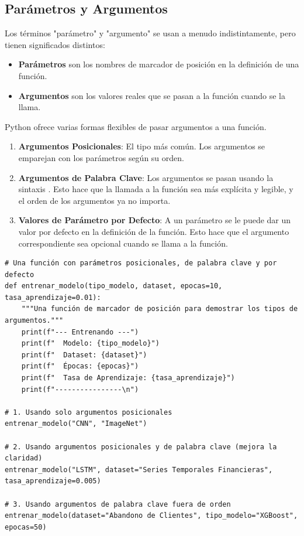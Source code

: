 \subsection{Parámetros y Argumentos}
\label{subsec:parameters_arguments}
Los términos "parámetro" y "argumento" se usan a menudo indistintamente, pero tienen significados distintos:
\begin{itemize}
    \item \textbf{Parámetros} son los nombres de marcador de posición en la definición de una función.
    \item \textbf{Argumentos} son los valores reales que se pasan a la función cuando se la llama.
\end{itemize}
Python ofrece varias formas flexibles de pasar argumentos a una función.

\begin{enumerate}
    \item \textbf{Argumentos Posicionales}: El tipo más común. Los argumentos se emparejan con los parámetros según su orden.
    \item \textbf{Argumentos de Palabra Clave}: Los argumentos se pasan usando la sintaxis . Esto hace que la llamada a la función sea más explícita y legible, y el orden de los argumentos ya no importa.
    \item \textbf{Valores de Parámetro por Defecto}: A un parámetro se le puede dar un valor por defecto en la definición de la función. Esto hace que el argumento correspondiente sea opcional cuando se llama a la función.
\end{enumerate}

\begin{example}
\text{ }\begin{verbatim}
# Una función con parámetros posicionales, de palabra clave y por defecto
def entrenar_modelo(tipo_modelo, dataset, epocas=10, tasa_aprendizaje=0.01):
    """Una función de marcador de posición para demostrar los tipos de argumentos."""
    print(f"--- Entrenando ---")
    print(f"  Modelo: {tipo_modelo}")
    print(f"  Dataset: {dataset}")
    print(f"  Épocas: {epocas}")
    print(f"  Tasa de Aprendizaje: {tasa_aprendizaje}")
    print(f"----------------\n")

# 1. Usando solo argumentos posicionales
entrenar_modelo("CNN", "ImageNet")

# 2. Usando argumentos posicionales y de palabra clave (mejora la claridad)
entrenar_modelo("LSTM", dataset="Series Temporales Financieras", tasa_aprendizaje=0.005)

# 3. Usando argumentos de palabra clave fuera de orden
entrenar_modelo(dataset="Abandono de Clientes", tipo_modelo="XGBoost", epocas=50)
\end{verbatim}
\end{example}

